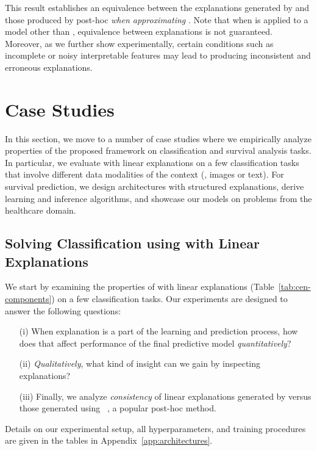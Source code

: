 \documentclass[twoside,11pt]{article}
\begin{document}
This result establishes an equivalence between the explanations generated by {\CEN} and those produced by {\LIME} post-hoc \emph{when approximating {\CEN}}.
Note that when {\LIME} is applied to a model other than {\CEN}, equivalence between explanations is not guaranteed.
Moreover, as we further show experimentally, certain conditions such as incomplete or noisy interpretable features may lead to {\LIME} producing inconsistent and erroneous explanations.
 
\section{Case Studies}
\label{sec:case-studies}

In this section, we move to a number of case studies where we empirically analyze properties of the proposed {\CEN} framework on classification and survival analysis tasks.
In particular, we evaluate {\CEN} with linear explanations on a few classification tasks that involve different data modalities of the context (\eg, images or text).
For survival prediction, we design {\CEN} architectures with structured explanations, derive learning and inference algorithms, and showcase our models on problems from the healthcare domain.

\subsection{Solving Classification using {\CEN} with Linear Explanations}
\label{sec:applications-classification}

We start by examining the properties of {\CEN} with linear explanations (Table~\ref{tab:cen-components}) on a few classification tasks.
Our experiments are designed to answer the following questions:
\begin{itemize}[itemsep=0pt,topsep=1ex,parsep=2pt,leftmargin=2em]
    \item[(i)] When explanation is a part of the learning and prediction process, how does that affect performance of the final predictive model \emph{quantitatively}?

    \item[(ii)] \emph{Qualitatively}, what kind of insight can we gain by inspecting explanations?

    \item[(iii)] Finally, we analyze \emph{consistency} of linear explanations generated by {\CEN} versus those generated using {\LIME}~\citep{ribeiro2016trust}, a popular post-hoc method.
\end{itemize}
Details on our experimental setup, all hyperparameters, and training procedures are given in the tables in Appendix~\ref{app:architectures}.
\end{document}
